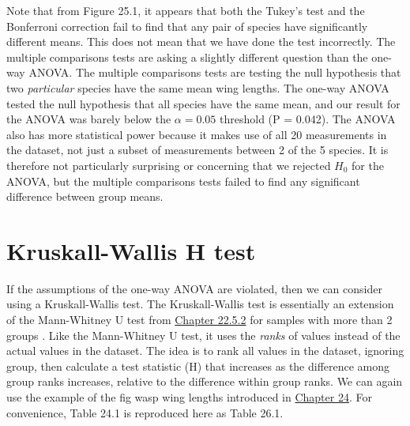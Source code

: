 \documentclass[
  openany]{krantz}
\begin{document}
Note that from Figure 25.1, it appears that both the Tukey's test and the Bonferroni correction fail to find that any pair of species have significantly different means.
This does not mean that we have done the test incorrectly.
The multiple comparisons tests are asking a slightly different question than the one-way ANOVA.
The multiple comparisons tests are testing the null hypothesis that two \emph{particular} species have the same mean wing lengths.
The one-way ANOVA tested the null hypothesis that all species have the same mean, and our result for the ANOVA was barely below the \(\alpha = 0.05\) threshold (P = 0.042).
The ANOVA also has more statistical power because it makes use of all 20 measurements in the dataset, not just a subset of measurements between 2 of the 5 species.
It is therefore not particularly surprising or concerning that we rejected \(H_{0}\) for the ANOVA, but the multiple comparisons tests failed to find any significant difference between group means.

\hypertarget{Chapter_26}{%
\chapter{Kruskall-Wallis H test}\label{Chapter_26}}

If the assumptions of the one-way ANOVA are violated, then we can consider using a Kruskall-Wallis test.
The Kruskall-Wallis test is essentially an extension of the Mann-Whitney U test from \protect\hyperlink{mann-whitney-u-test}{Chapter 22.5.2} for samples with more than 2 groups \citep{Kruskal1952}.
Like the Mann-Whitney U test, it uses the \emph{ranks} of values instead of the actual values in the dataset.
The idea is to rank all values in the dataset, ignoring group, then calculate a test statistic (H) that increases as the difference among group ranks increases, relative to the difference within group ranks.
We can again use the example of the fig wasp wing lengths introduced in \protect\hyperlink{Chapter_24}{Chapter 24}.
For convenience, Table 24.1 is reproduced here as Table 26.1.
\end{document}
